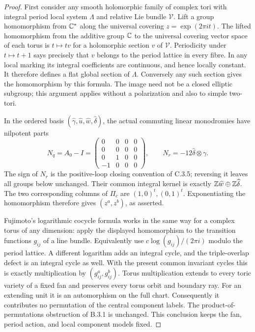 \begin{proof}
First consider any smooth holomorphic family of
complex tori with integral period local system
$\Lambda$ and relative Lie bundle $\mathcal V$.
Lift a group homomorphism from $\mathbb C^*$ along the
universal covering $z=\exp(2\pi i t)$.
The lifted homomorphism from the additive group
$\mathbb C$ to the universal covering vector space of
each torus is $t\mapsto t v$ for a holomorphic
section $v$ of $\mathcal V$.  Periodicity under
$t\mapsto t+1$ says precisely that $v$ belongs
to the period lattice in every fibre.  In any
local marking its integral coefficients are
continuous, and hence locally constant.  It
therefore defines a flat global section of
$\Lambda$.  Conversely any such section gives
the homomorphism by this formula.  The image
need not be a closed elliptic subgroup; this
argument applies without a polarization and
also to simple two-tori.

In the ordered basis
$(\widehat\gamma,\widehat u,\widehat w,\widehat\delta)$,
the actual commuting linear monodromies have
nilpotent parts
\[
 N_q=A_0-I=
 \begin{pmatrix}
 0&0&0&0\\0&0&0&0\\0&1&0&0\\-1&0&0&0
 \end{pmatrix},\qquad
 N_r=-12\widehat\delta\otimes\gamma.
\]
The sign of $N_r$ is the positive-loop closing
convention of C.3.5; reversing it leaves all
groups below unchanged.  Their common integral
kernel is exactly $\mathbb Z\widehat w\oplus\mathbb Z\widehat\delta$.
The two corresponding columns of $\Pi_c$ are
$(1,0)^t,(0,1)^t$.  Exponentiating the homomorphism
therefore gives $(z^a,z^b)$, as asserted.

Fujimoto's logarithmic cocycle formula
\citep[Definition 1.1]{Fujimoto1990AB} works in
the same way for a complex torus of any dimension:
apply the displayed homomorphism to the transition
functions $g_{ij}$ of a line bundle.  Equivalently
use $c\log(g_{ij})/(2\pi i)$ modulo the period
lattice.  A different logarithm adds an integral
cycle, and the triple-overlap defect is an
integral cycle as well.  With the present common
invariant cycles this is exactly multiplication
by $(g_{ij}^a,g_{ij}^b)$.  Torus multiplication
extends to every toric variety of a fixed fan
and preserves every torus orbit and boundary
ray.  For an extending unit it is an automorphism
on the full chart.  Consequently it contributes
no permutation of the central component labels.
The product-of-permutations obstruction of B.3.1
is unchanged.  This conclusion keeps the fan,
period action, and local component models fixed.


\end{proof}
